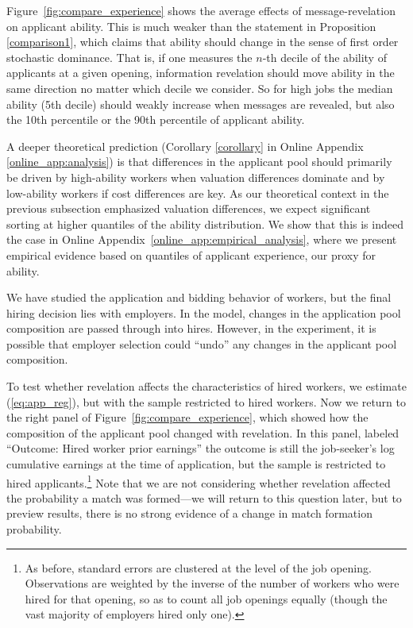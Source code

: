 \documentclass[12pt]{article}
\makeatletter
\renewcommand{\subsection}{%
  \@startsection{subsection}{2}{\z@}%
  {-3.25ex plus -1ex minus -.2ex}%
  {1.5ex plus .2ex}%
  {\normalfont\large\bfseries}%
}
\makeatother
\begin{document}

Figure~\ref{fig:compare_experience} shows the average effects of message-revelation on applicant ability. This is much weaker than the statement in Proposition \ref{comparison1}, which claims that ability should change in the sense of first order stochastic dominance. 
That is, if one measures the $n$-th decile of the ability of applicants at a given opening, information revelation should move ability in the same direction no matter which decile we consider. So for high jobs the median ability (5th decile) should weakly increase when messages are revealed, but also the 10th percentile or the 90th percentile of applicant ability. 

A deeper theoretical prediction (Corollary \ref{corollary} in Online Appendix \ref{online_app:analysis}) is that differences in the applicant pool should primarily be driven by high-ability workers when valuation differences dominate and by low-ability workers if cost differences are key. 
As our theoretical context in the previous subsection emphasized valuation differences, we expect significant sorting at higher quantiles of the ability distribution. 
We show that this is indeed the case in Online Appendix~\ref{online_app:empirical_analysis}, where we present empirical evidence based on quantiles of applicant experience, our proxy for ability.


We have studied the application and bidding behavior of workers, but the final hiring decision lies with employers.
In the model, changes in the application pool composition are passed through into hires.
However, in the experiment, it is possible that employer selection could ``undo'' any changes in the applicant pool composition. 

To test whether revelation affects the characteristics of hired workers, we estimate (\ref{eq:app_reg}), but with the sample restricted to hired workers.
Now we return to the right panel of Figure~\ref{fig:compare_experience}, which showed how the composition of the applicant pool changed with revelation.
In this panel, labeled ``Outcome: Hired worker prior earnings''  the outcome is still the job-seeker's log cumulative earnings at the time of application, but the sample is restricted to hired applicants.\footnote{
As before, standard errors are clustered at the level of the job opening.
Observations are weighted by the inverse of the number of workers who were hired for that opening, so as to count all job openings equally (though the vast majority of employers hired only one).}
Note that we are not considering whether revelation affected the probability a match was formed---we will return to this question later, but to preview results, there is no strong evidence of a change in match formation probability. 
\end{document}
